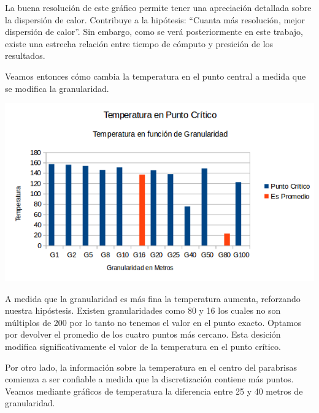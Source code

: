 	La buena resolución de este gráfico permite tener una apreciación detallada sobre la dispersión de calor. Contribuye a la hipótesis: ``Cuanta más resolución, mejor dispersión de calor''. Sin embargo, como se verá posteriormente en este trabajo, existe una estrecha relación entre tiempo de cómputo y presición de los resultados. 
	
	Veamos entonces cómo cambia la temperatura en el punto central a medida que se modifica la granularidad.


	\begin{center}
		\includegraphics[scale=0.75]{./img/temp_punto_critico/temppuntocritico.png}
	\end{center}

	A medida que la granularidad es más fina la temperatura aumenta, reforzando nuestra hipóstesis. Existen granularidades como 80 y 16 los cuales no son múltiplos de 200 por lo tanto no tenemos el valor en el punto exacto. Optamos por devolver el promedio de los cuatro puntos más cercano. Esta desición modifica significativamente el valor de la temperatura en el punto crítico. 

	Por otro lado, la información sobre la temperatura en el centro del parabrisas comienza a ser confiable a medida que la discretización contiene más puntos. Veamos mediante gráficos de temperatura la diferencia entre 25 y 40 metros de granularidad.

